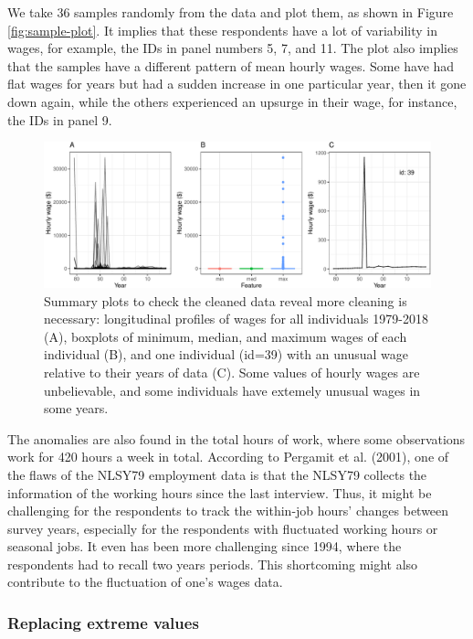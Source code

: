 \documentclass{article}
\begin{document}
We take 36 samples randomly from the data and plot them, as shown in Figure \ref{fig:sample-plot}. It implies that these respondents have a lot of variability in wages, for example, the IDs in panel numbers 5, 7, and 11. The plot also implies that the samples have a different pattern of mean hourly wages. Some have had flat wages for years but had a sudden increase in one particular year, then it gone down again, while the others experienced an upsurge in their wage, for instance, the IDs in panel 9.

\begin{figure}

{\centering \includegraphics[width=1\linewidth]{figures/feature-plot-1} 

}

\caption{Summary plots to check the cleaned data reveal more cleaning is necessary: longitudinal profiles of wages for all individuals 1979-2018 (A), boxplots of minimum, median, and maximum wages of each individual (B), and one individual (id=39) with an unusual wage relative to their years of data (C). Some values of hourly wages are unbelievable, and some individuals have extemely unusual wages in some years.}\label{fig:feature-plot}
\end{figure}

The anomalies are also found in the total hours of work, where some observations work for 420 hours a week in total. According to Pergamit et al. (2001), one of the flaws of the NLSY79 employment data is that the NLSY79 collects the information of the working hours since the last interview. Thus, it might be challenging for the respondents to track the within-job hours' changes between survey years, especially for the respondents with fluctuated working hours or seasonal jobs. It even has been more challenging since 1994, where the respondents had to recall two years periods. This shortcoming might also contribute to the fluctuation of one's wages data.

\hypertarget{replacing-extreme-values}{%
\subsubsection{Replacing extreme values}\label{replacing-extreme-values}}
\end{document}
